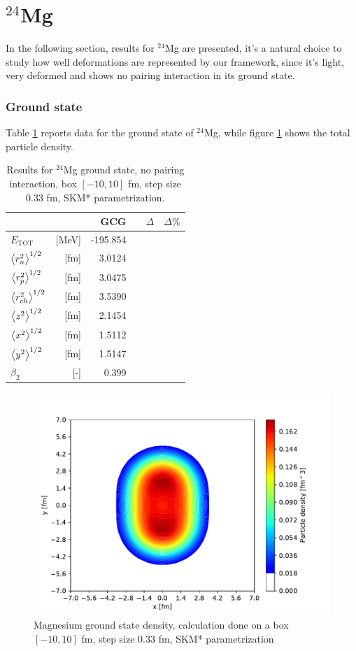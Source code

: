 \section{$^{24}$Mg}
In the following section, results for $^{24}$Mg are presented, it's a natural choice to study how well deformations are represented by our framework, since it's light, very deformed and shows no pairing interaction in its ground state.
\subsubsection{Ground state}
Table \ref{tab:mg_table} reports data for the ground state of $^{24}$Mg, while figure \ref{fig:mg_gs_density_axial} shows the total particle density.
\begin{table}[ht]
  \centering
  \begin{tabular}{lrrccc}
    \addlinespace[0.3em]
    \toprule
    && GCG & & $\Delta$ & $\Delta\%$ \\
    \midrule
    $E_{\text{TOT}}$& [MeV]    & -195.854 & & &  \\
    $\expval{ r^2_n}^{1/2}$    &[fm] & 3.0124    &  &  & \\
    $\expval{ r^2_p}^{1/2}$    &[fm] & 3.0475    &  &  & \\
    $\expval{ r^2_{ch}}^{1/2}$ &[fm] & 3.5390    &  &  & \\
    $\expval{z^2}^{1/2}$ &[fm] & 2.1454 &  &  &\\
    $\expval{x^2}^{1/2}$ &[fm] & 1.5112 &  &  &\\
    $\expval{y^2}^{1/2}$ &[fm] & 1.5147 &  &  &\\
    $\beta_2$ &[-] & 0.399 & & & \\
    \bottomrule
  \end{tabular}
  \caption{Results for $^{24}$Mg ground state, no pairing interaction, box $[-10, 10]$ fm, step size 0.33 fm, SKM* parametrization.}
  \label{tab:mg_table}
\end{table}

\begin{figure}[h]
  \centering
  \includegraphics[width=1.0\linewidth]{Images/mg_gs_density_axial.pdf}
  \caption{Magnesium ground state density, calculation done on a box $[-10, 10]$ fm, step size 0.33 fm, SKM* parametrization}
  \label{fig:mg_gs_density_axial}
\end{figure}
